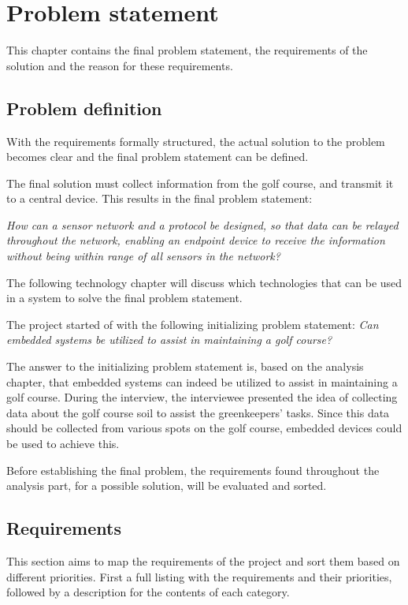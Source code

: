 \chapter{Problem statement}
This chapter contains the final problem statement, the requirements of the solution and the reason for these requirements.

\section{Problem definition}
With the requirements formally structured, the actual solution to the problem becomes clear and the final problem statement can be defined.

The final solution must collect information from the golf course, and transmit it to a central device. This results in the final problem statement:

\textit{How can a sensor network and a protocol be designed, so that data can be relayed throughout the network, enabling an endpoint device to receive the information without being within range of all sensors in the network?}

The following technology chapter will discuss which technologies that can be used in a system to solve the final problem statement.

The project started of with the following initializing problem statement:
\textit{Can embedded systems be utilized to assist in maintaining a golf course?}

The answer to the initializing problem statement is, based on the analysis chapter, that embedded systems can indeed be utilized to assist in maintaining a golf course. During the interview, the interviewee presented the idea of collecting data about the golf course soil to assist the greenkeepers' tasks. Since this data should be collected from various spots on the golf course, embedded devices could be used to achieve this.

Before establishing the final problem, the requirements found throughout the analysis part, for a possible solution, will be evaluated and sorted.

\section{Requirements}
This section aims to map the requirements of the project and sort them based on different priorities. First a full listing with the requirements and their priorities, followed by a description for the contents of each category.

